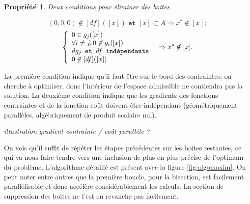 \documentclass[12pt,a4paper]{article}
\newtheorem{prop}{Propriété}
\begin{document}
    \begin{prop}
        Deux conditions pour éliminer des boites

        \begin{equation}\label{eq:cond1} (0, 0, 0) \notin [df]([x]) \texttt{ et } [x] \subset A \Rightarrow x^* \notin [x];\end{equation}
        \begin{equation} \label{eq:cond3}
            \left\{
            \begin{array}[h]{l}
                0 \in g_j([x]) \\
                \forall i \not = j, 0 \not \in  g_i([x]) \\
                dg_j \texttt{ et } df \texttt{ indépendants }  \\
                0 \not \in [df]([x])
            \end{array}
            \right.
            \Rightarrow x^* \not \in [x].
        \end{equation}
    \end{prop}

    La première condition indique qu'il faut être sur le bord des contraintes: on cherche à optimiser, donc l'intérieur de l'espace admissible ne contiendra pas la solution. La deuxième condition indique que les gradients des fonctions contraintes et de la fonction coût doivent être indépendant (géométriquement parallèles, algébriquement de produit scalaire nul).

    \textit{illustration gradient contrainte / coût parallèle ?}


    On vois qu'il suffit de répéter les étapes précédentes sur les boites restantes, ce qui va nous faire tendre vers une inclusion de plus en plus précise de l'optimum du problème. L'algorithme détaillé est présent avec la figure \ref{fig:algomaxim}. On peut noter entre autres que la première boucle, pour la bisection, est facilement parallélisable et donc accélère considérablement les calculs. La section de suppression des boites ne l'est en revanche pas facilement.
\end{document}
